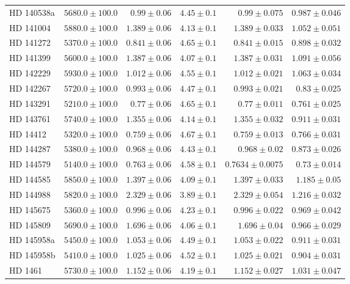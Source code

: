 \begin{longtable*}{lrrrrr}
HD 140538a & $5680.0\pm 100.0$ & $0.99\pm 0.06$ & $4.45\pm 0.1$ & $0.99\pm 0.075$ & $0.987\pm 0.046$ \\ 
HD 141004 & $5880.0\pm 100.0$ & $1.389\pm 0.06$ & $4.13\pm 0.1$ & $1.389\pm 0.033$ & $1.052\pm 0.051$ \\ 
HD 141272 & $5370.0\pm 100.0$ & $0.841\pm 0.06$ & $4.65\pm 0.1$ & $0.841\pm 0.015$ & $0.898\pm 0.032$ \\ 
HD 141399 & $5600.0\pm 100.0$ & $1.387\pm 0.06$ & $4.07\pm 0.1$ & $1.387\pm 0.031$ & $1.091\pm 0.056$ \\ 
HD 142229 & $5930.0\pm 100.0$ & $1.012\pm 0.06$ & $4.55\pm 0.1$ & $1.012\pm 0.021$ & $1.063\pm 0.034$ \\ 
HD 142267 & $5720.0\pm 100.0$ & $0.993\pm 0.06$ & $4.47\pm 0.1$ & $0.993\pm 0.021$ & $0.83\pm 0.025$ \\ 
HD 143291 & $5210.0\pm 100.0$ & $0.77\pm 0.06$ & $4.65\pm 0.1$ & $0.77\pm 0.011$ & $0.761\pm 0.025$ \\ 
HD 143761 & $5740.0\pm 100.0$ & $1.355\pm 0.06$ & $4.14\pm 0.1$ & $1.355\pm 0.032$ & $0.911\pm 0.031$ \\ 
HD 14412 & $5320.0\pm 100.0$ & $0.759\pm 0.06$ & $4.67\pm 0.1$ & $0.759\pm 0.013$ & $0.766\pm 0.031$ \\ 
HD 144287 & $5380.0\pm 100.0$ & $0.968\pm 0.06$ & $4.43\pm 0.1$ & $0.968\pm 0.02$ & $0.873\pm 0.026$ \\ 
HD 144579 & $5140.0\pm 100.0$ & $0.763\pm 0.06$ & $4.58\pm 0.1$ & $0.7634\pm 0.0075$ & $0.73\pm 0.014$ \\ 
HD 144585 & $5850.0\pm 100.0$ & $1.397\pm 0.06$ & $4.09\pm 0.1$ & $1.397\pm 0.033$ & $1.185\pm 0.05$ \\ 
HD 144988 & $5820.0\pm 100.0$ & $2.329\pm 0.06$ & $3.89\pm 0.1$ & $2.329\pm 0.054$ & $1.216\pm 0.032$ \\ 
HD 145675 & $5360.0\pm 100.0$ & $0.996\pm 0.06$ & $4.23\pm 0.1$ & $0.996\pm 0.022$ & $0.969\pm 0.042$ \\ 
HD 145809 & $5690.0\pm 100.0$ & $1.696\pm 0.06$ & $4.06\pm 0.1$ & $1.696\pm 0.04$ & $0.966\pm 0.029$ \\ 
HD 145958a & $5450.0\pm 100.0$ & $1.053\pm 0.06$ & $4.49\pm 0.1$ & $1.053\pm 0.022$ & $0.911\pm 0.031$ \\ 
HD 145958b & $5410.0\pm 100.0$ & $1.025\pm 0.06$ & $4.52\pm 0.1$ & $1.025\pm 0.021$ & $0.904\pm 0.031$ \\ 
HD 1461 & $5730.0\pm 100.0$ & $1.152\pm 0.06$ & $4.19\pm 0.1$ & $1.152\pm 0.027$ & $1.031\pm 0.047$ \\ 

\end{longtable*}
